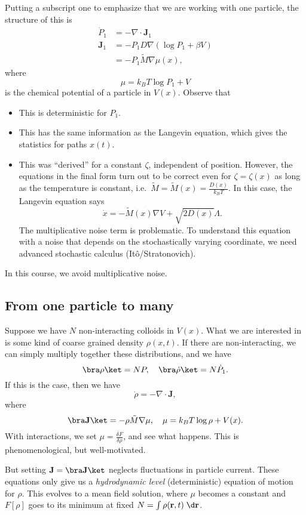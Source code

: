 \documentclass[a4paper]{article}
\begin{document}
Putting a subscript one to emphasize that we are working with one particle, the structure of this is
\begin{align*}
  \dot{P}_1 &= - \nabla \cdot \mathbf{J}_1\\
  \mathbf{J}_1 &= -P_1 D \nabla (\log P_1 + \beta V)\\
  &= -P_1 \tilde{M} \nabla \mu(x),
\end{align*}
where
\[
  \mu = k_B T \log P_1 + V
\]
is the chemical potential of a particle in $V(x)$. Observe that
\begin{itemize}
  \item This is deterministic for $P_1$.
  \item This has the same information as the Langevin equation, which gives the statistics for paths $x(t)$.
  \item This was ``derived'' for a constant $\zeta$, independent of position. However, the equations in the final form turn out to be correct even for $\zeta = \zeta(x)$ as long as the temperature is constant, i.e.\ $\tilde{M} = \tilde{M}(x) = \frac{D(x)}{k_B T}$. In this case, the Langevin equation says
    \[
      \dot{x} = - \tilde{M}(x) \nabla V + \sqrt{2 D(x)} \Lambda.
    \]
    The multiplicative noise term is problematic. To understand this equation with a noise that depends on the stochastically varying coordinate, we need advanced stochastic calculus (It\^o/Stratonovich).
\end{itemize}
In this course, we avoid multiplicative noise.

\subsection{From one particle to many}
Suppose we have $N$ non-interacting colloids in $V(x)$. What we are interested in is some kind of coarse grained density $\rho(x, t)$. If there are non-interacting, we can simply multiply together these distributions, and we have
\[
  \bra \rho\ket = NP,\quad \bra \dot{\rho}\ket = N \dot{P}_1.
\]
If this is the case, then we have
\[
  \dot{\rho} = - \nabla \cdot \mathbf{J},
\]
where
\[
  \bra \mathbf{J}\ket = - \rho \tilde{M} \nabla \mu,\quad \mu = k_B T \log \rho + V(x).
\]
With interactions, we set $\mu = \frac{\delta F}{\delta \rho}$, and see what happens. This is phenomenological, but well-motivated.

But setting $\mathbf{J} = \bra \mathbf{J}\ket$ neglects fluctuations in particle current. These equations only give us a \emph{hydrodynamic level} (deterministic) equation of motion for $\rho$. This evolves to a mean field solution, where $\mu$ becomes a constant and $F[\rho]$ goes to its minimum at fixed $N = \int \rho(\mathbf{r}, t) \;\d \mathbf{r}$.
\end{document}
